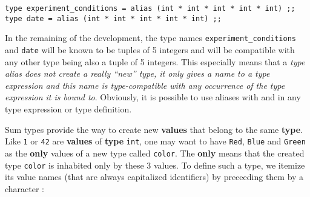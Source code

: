 {\scriptsize
\begin{lstlisting}
type experiment_conditions = alias (int * int * int * int * int) ;;
type date = alias (int * int * int * int * int) ;;
\end{lstlisting}
}

\vspace{0.2cm}
\begin{syn}
 \is {}   
\end{syn}
\vspace{0.2cm}

In the remaining of the development, the type names
{\tt  experiment\_conditions} and {\tt date} will be known to be
tuples of 5 integers and will be compatible with any other type being
also a tuple of 5 integers. This especially means that a {\em type alias
does not create a really ``new'' type, it only gives a name to a type
expression and this name is type-compatible with any occurrence of the
type expression it is bound to}. Obviously, it is possible to use
aliases with and in any type expression or type definition.








\vspace{0.5cm}

Sum types provide the way to create new {\bf values} that
 belong to the same {\bf type}. Like {\tt 1} or {\tt 42} are
{\bf values} of {\bf type} {\tt int}, one may want to have {\tt Red},
{\tt Blue} and {\tt Green} as the {\bf only} values of a new type
called  {\tt color}. The {\bf only}  means that the created type {\tt color}
is inhabited only by these 3 values. To define
such a type, we itemize its value names (that are always capitalized
identifiers) by  preceeding them by a \terminal{\vertical} character :

